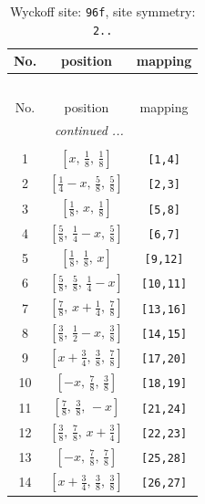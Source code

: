 \documentclass[fleqn,8pt]{jsarticle}
\begin{document}
\renewcommand{\arraystretch}{1.2}
\begin{longtable}{ccc}
\caption{Wyckoff site: {\tt 96f}, site symmetry: {\tt 2..}}
 \\
 \hline \hline
No. & position & mapping \\ \hline \endfirsthead

\multicolumn{2}{l}{\tablename\ \thetable{}} \\
 \hline \hline
No. & position & mapping \\ \hline \endhead

 \hline \hline
\multicolumn{2}{r}{\footnotesize\it continued ...} \\ \endfoot

 \hline \hline
\multicolumn{2}{r}{} \\ \endlastfoot

1 & $\left[ x,\, \frac{1}{8},\, \frac{1}{8} \right]$ & {\tt [1,4]} \\ \hline
2 & $\left[ \frac{1}{4} - x,\, \frac{5}{8},\, \frac{5}{8} \right]$ & {\tt [2,3]} \\ \hline
3 & $\left[ \frac{1}{8},\, x,\, \frac{1}{8} \right]$ & {\tt [5,8]} \\ \hline
4 & $\left[ \frac{5}{8},\, \frac{1}{4} - x,\, \frac{5}{8} \right]$ & {\tt [6,7]} \\ \hline
5 & $\left[ \frac{1}{8},\, \frac{1}{8},\, x \right]$ & {\tt [9,12]} \\ \hline
6 & $\left[ \frac{5}{8},\, \frac{5}{8},\, \frac{1}{4} - x \right]$ & {\tt [10,11]} \\ \hline
7 & $\left[ \frac{7}{8},\, x + \frac{1}{4},\, \frac{7}{8} \right]$ & {\tt [13,16]} \\ \hline
8 & $\left[ \frac{3}{8},\, \frac{1}{2} - x,\, \frac{3}{8} \right]$ & {\tt [14,15]} \\ \hline
9 & $\left[ x + \frac{3}{4},\, \frac{3}{8},\, \frac{7}{8} \right]$ & {\tt [17,20]} \\ \hline
10 & $\left[ - x,\, \frac{7}{8},\, \frac{3}{8} \right]$ & {\tt [18,19]} \\ \hline
11 & $\left[ \frac{7}{8},\, \frac{3}{8},\, - x \right]$ & {\tt [21,24]} \\ \hline
12 & $\left[ \frac{3}{8},\, \frac{7}{8},\, x + \frac{3}{4} \right]$ & {\tt [22,23]} \\ \hline
13 & $\left[ - x,\, \frac{7}{8},\, \frac{7}{8} \right]$ & {\tt [25,28]} \\ \hline
14 & $\left[ x + \frac{3}{4},\, \frac{3}{8},\, \frac{3}{8} \right]$ & {\tt [26,27]} \\ \hline

\end{longtable}
\end{document}

